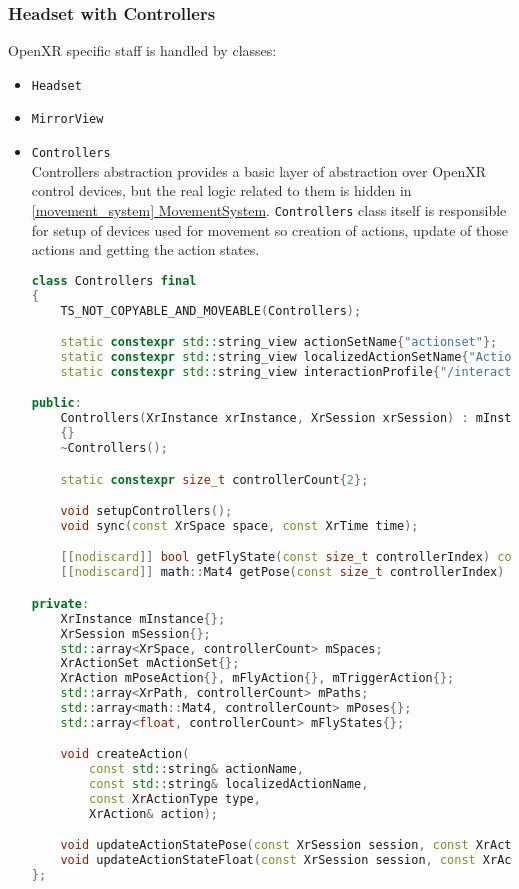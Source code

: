 \subsubsection{Headset with Controllers}
\label{sec:headset}
OpenXR specific staff is handled by classes:
\begin{itemize}
    \item \texttt{Headset}\\
    \item \texttt{MirrorView}\\
    \item \texttt{Controllers}\\
    Controllers abstraction provides a basic layer of abstraction over OpenXR control devices, but the real logic related to them is hidden in \hyperref[movement_system]{\ref*{movement_system} MovementSystem}. \texttt{Controllers} class itself is responsible for setup of devices used for movement so creation of actions, update of those actions and getting the action states.
\begin{lstlisting}[language=c++, caption=Controllers header(./engine/src/core/controllers.h)]
class Controllers final
{
    TS_NOT_COPYABLE_AND_MOVEABLE(Controllers);

    static constexpr std::string_view actionSetName{"actionset"};
    static constexpr std::string_view localizedActionSetName{"Actions"};
    static constexpr std::string_view interactionProfile{"/interaction_profiles/khr/simple_controller"};

public:
    Controllers(XrInstance xrInstance, XrSession xrSession) : mInstance(xrInstance), mSession(xrSession)
    {}
    ~Controllers();

    static constexpr size_t controllerCount{2};

    void setupControllers();
    void sync(const XrSpace space, const XrTime time);

    [[nodiscard]] bool getFlyState(const size_t controllerIndex) const { return mFlyStates.at(controllerIndex); }
    [[nodiscard]] math::Mat4 getPose(const size_t controllerIndex) const { return mPoses.at(controllerIndex); }

private:
    XrInstance mInstance{};
    XrSession mSession{};
    std::array<XrSpace, controllerCount> mSpaces;
    XrActionSet mActionSet{};
    XrAction mPoseAction{}, mFlyAction{}, mTriggerAction{};
    std::array<XrPath, controllerCount> mPaths;
    std::array<math::Mat4, controllerCount> mPoses{};
    std::array<float, controllerCount> mFlyStates{};

    void createAction(
        const std::string& actionName,
        const std::string& localizedActionName,
        const XrActionType type,
        XrAction& action);

    void updateActionStatePose(const XrSession session, const XrAction action, const XrPath path, XrActionStatePose& state);
    void updateActionStateFloat(const XrSession session, const XrAction action, const XrPath path, XrActionStateFloat& state);
};
\end{lstlisting}

\end{itemize}